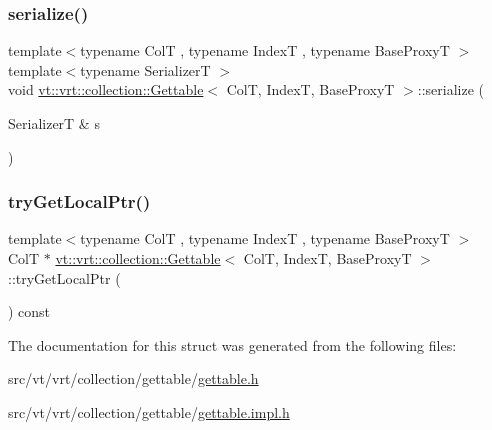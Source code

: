 \subsubsection{\texorpdfstring{serialize()}{serialize()}}
{\footnotesize\ttfamily template$<$typename ColT , typename IndexT , typename Base\+ProxyT $>$ \\
template$<$typename SerializerT $>$ \\
void \hyperlink{structvt_1_1vrt_1_1collection_1_1_gettable}{vt\+::vrt\+::collection\+::\+Gettable}$<$ ColT, IndexT, Base\+ProxyT $>$\+::serialize (\begin{DoxyParamCaption}\item[{SerializerT \&}]{s }\end{DoxyParamCaption})}

\mbox{\label{structvt_1_1vrt_1_1collection_1_1_gettable_ab75a8d5318324a48ceac30e01685a517}} 
\subsubsection{\texorpdfstring{try\+Get\+Local\+Ptr()}{tryGetLocalPtr()}}
{\footnotesize\ttfamily template$<$typename ColT , typename IndexT , typename Base\+ProxyT $>$ \\
ColT $\ast$ \hyperlink{structvt_1_1vrt_1_1collection_1_1_gettable}{vt\+::vrt\+::collection\+::\+Gettable}$<$ ColT, IndexT, Base\+ProxyT $>$\+::try\+Get\+Local\+Ptr (\begin{DoxyParamCaption}{ }\end{DoxyParamCaption}) const}



The documentation for this struct was generated from the following files\+:\begin{DoxyCompactItemize}
\item 
src/vt/vrt/collection/gettable/\hyperlink{gettable_8h}{gettable.\+h}\item 
src/vt/vrt/collection/gettable/\hyperlink{gettable_8impl_8h}{gettable.\+impl.\+h}\end{DoxyCompactItemize}
